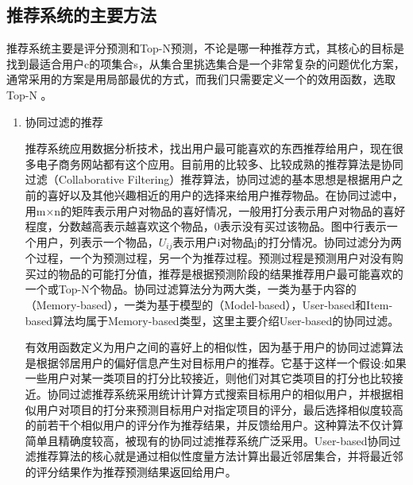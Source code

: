 	\subsection{推荐系统的主要方法}
	推荐系统主要是评分预测和Top-N预测，不论是哪一种推荐方式，其核心的目标是找到最适合用户c的项集合s，从集合里挑选集合是一个非常复杂的问题优化方案，通常采用的方案是用局部最优的方式，而我们只需要定义一个的效用函数，选取Top-N	\citep{recmd-Next}。
	\begin{enumerate}[(1)]
	\item 协同过滤的推荐

	推荐系统应用数据分析技术，找出用户最可能喜欢的东西推荐给用户，现在很多电子商务网站都有这个应用。目前用的比较多、比较成熟的推荐算法是协同过滤（Collaborative Filtering）推荐算法，协同过滤的基本思想是根据用户之前的喜好以及其他兴趣相近的用户的选择来给用户推荐物品。在协同过滤中，用m×n的矩阵表示用户对物品的喜好情况，一般用打分表示用户对物品的喜好程度，分数越高表示越喜欢这个物品，0表示没有买过该物品。图中行表示一个用户，列表示一个物品，$U_{ij}$表示用户i对物品j的打分情况。协同过滤分为两个过程，一个为预测过程，另一个为推荐过程。预测过程是预测用户对没有购买过的物品的可能打分值，推荐是根据预测阶段的结果推荐用户最可能喜欢的一个或Top-N个物品。协同过滤算法分为两大类，一类为基于内容的（Memory-based），一类为基于模型的（Model-based），User-based和Item-based算法均属于Memory-based类型\citep{Wikipedia}，这里主要介绍User-based的协同过滤。

	有效用函数定义为用户之间的喜好上的相似性，因为基于用户的协同过滤算法是根据邻居用户的偏好信息产生对目标用户的推荐。它基于这样一个假设:如果一些用户对某一类项目的打分比较接近，则他们对其它类项目的打分也比较接近。协同过滤推荐系统采用统计计算方式搜索目标用户的相似用户，并根据相似用户对项目的打分来预测目标用户对指定项目的评分，最后选择相似度较高的前若干个相似用户的评分作为推荐结果，并反馈给用户。这种算法不仅计算简单且精确度较高，被现有的协同过滤推荐系统广泛采用。User-based协同过滤推荐算法的核心就是通过相似性度量方法计算出最近邻居集合，并将最近邻的评分结果作为推荐预测结果返回给用户。


\end{enumerate}
